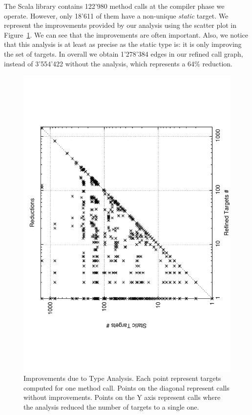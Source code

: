 \documentclass[a4paper]{article}
\begin{document}
The Scala library contains 122'980 method calls at the compiler phase we
operate. However, only 18'611 of them have a non-unique \emph{static} target.
We represent the improvements provided by our analysis using the scatter plot
in Figure~\ref{fig:scatter}. We can see that the improvements are often
important. Also, we notice that this analysis is at least as precise as the
static type is: it is only improving the set of targets. In overall we obtain
1'278'384 edges in our refined call graph, instead of 3'554'422 without the
analysis, which represents a 64\% reduction.

\begin{figure}[h]
    \begin{center}
    \includegraphics[scale=0.6]{images/scatter}
    \end{center}
    \caption{Improvements due to Type Analysis. Each point represent targets
    computed for one method call. Points on the diagonal represent calls
    without improvements. Points on the Y axis represent calls where the
    analysis reduced the number of targets to a single one.}
    \label{fig:scatter}
\end{figure}
\end{document}
